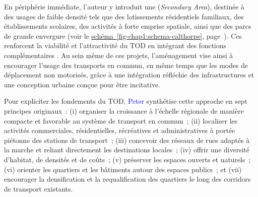 \begin{refsegment}
En périphérie immédiate, l’auteur y introduit une  (\textsl{Secondary Area}), destinée à des usages de faible densité tels que des lotissements résidentiels familiaux, des établissements scolaires, des activités à forte emprise spatiale, ainsi que des parcs de grande envergure (voir le \hyperref[fig-chap1:schema-calthorpe]{schéma~\ref{fig-chap1:schema-calthorpe}}, page~\pageref{fig-chap1:schema-calthorpe}). Ces  renforcent la viabilité et l’attractivité du \acrshort{TOD} en intégrant des fonctions complémentaires \textcolor{blue}{\autocite[42, 60, 87]{calthorpe_next_1993}}. Au sein même de ces projets, l’aménagement vise ainsi à encourager l’usage des transports en commun, en même temps que les modes de déplacement non motorisés, grâce à une intégration réfléchie des infrastructures et une conception urbaine conçue pour être incitative.%

Pour expliciter les fondements du \acrshort{TOD}, \textcolor{blue}{Peter} \textcolor{blue}{\textcite[43]{calthorpe_next_1993}} synthétise cette approche en sept principes originaux~: (i) organiser la croissance à l’échelle régionale de manière compacte et favorable au système de transport en commun~; (ii) localiser les activités commerciales, résidentielles, récréatives et administratives à portée piétonne des stations de transport~; (iii) concevoir des réseaux de rues adaptés à la marche et reliant directement les destinations locales~; (iv) offrir une diversité d'habitat, de densités et de coûts~; (v) préserver les espaces ouverts et naturels~; (vi) orienter les quartiers et les bâtiments autour des espaces publics~; et (vii) encourager la densification et la requalification des quartiers le long des corridors de transport existants.%


\end{refsegment}
